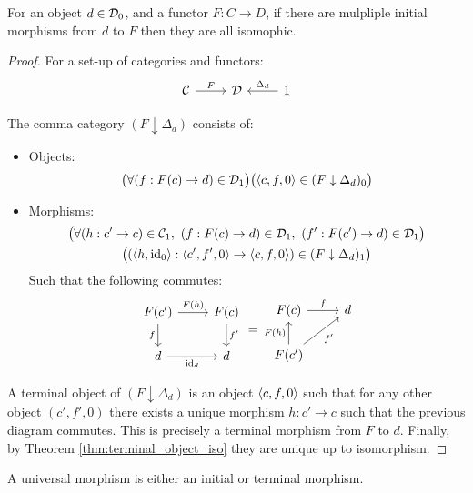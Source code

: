 \begin{theorem}
	For an object $d\in \mathcal{D}_0$, and a functor $F:C\to D$, if there are mulpliple
	initial morphisms from $d$ to $F$ then they are all isomophic.

	\begin{proof}
		For a set-up of categories and functors:
		\[\begin{tikzcd}[ampersand replacement=\&]
			\C \& \D \& {\underline{1}}
			\arrow["F", from=1-1, to=1-2]
			\arrow["{\Delta_d}"', from=1-3, to=1-2]
		\end{tikzcd}\]

		The comma category $(F \downarrow \Delta_d)$ consists of:
		\begin{itemize}
			\item Objects:
				\[
					\big(\forall (f: F(c)\to d)\in \mathcal{D}_1\big)
					\big(\langle c, f, 0\rangle \in (F\downarrow \Delta _d)_0\big)
				\]
			\item Morphisms:
				\[
					\begin{gathered}
						\big(\forall (h: c'\to c)\in \mathcal{C}_1
							,\ (f:F(c)\to d)\in \mathcal{D}_1,\ (f':F(c') \to d)\in\mathcal{D}_1\big)\\
						\big((\langle h, \mathrm{id}_0\rangle: \langle c', f', 0\rangle \to \langle c, f, 0\rangle)\in (F\downarrow\Delta_d)_1 \big)
						\end{gathered}
				\]
				Such that the following commutes:
				\[\begin{tikzcd}
					{F(c')} & {F(c)} \\
					d & d
					\arrow["{F(h)}", from=1-1, to=1-2]
					\arrow["{\mathrm{id}_d}"', from=2-1, to=2-2]
					\arrow["f"', from=1-1, to=2-1]
					\arrow["{f'}", from=1-2, to=2-2]
				\end{tikzcd}
				=
				\begin{tikzcd}
					{F(c)} & d \\
					{F(c')}
					\arrow["{F(h)}", from=2-1, to=1-1]
					\arrow["{f'}"', from=2-1, to=1-2]
					\arrow["f", from=1-1, to=1-2]
				\end{tikzcd}\]
		\end{itemize}
		A terminal object of $(F\downarrow \Delta_d)$ is an object $\langle c,f,0\rangle$ such
		that for any other object $(c', f', 0)$ there exists a unique morphism $h:c'
		\to c$ such that the previous diagram commutes. This is precisely a terminal
		morphism from $F$ to $d$. Finally, by Theorem \ref{thm:terminal_object_iso}
		they are unique up to isomorphism.
	\end{proof}
\end{theorem}

\begin{definition}
	A universal morphism is either an initial or terminal morphism.
	\parencite{lane:working_mathematician}
\end{definition}
